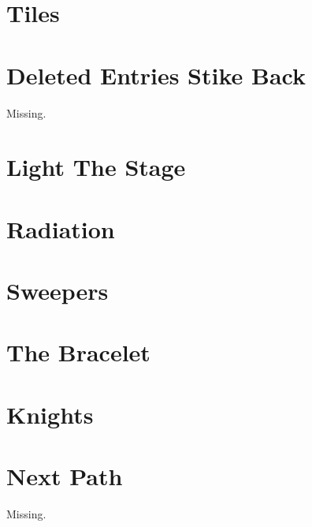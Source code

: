 \documentclass[a4paper, 10pt]{article}
\let\stdsection\section
\renewcommand\section{\newpage\stdsection}
\newcommand{\includecode}[1]{
    }
\newcommand{\algoAuthor}{2} %
\begin{document}
    \section{Tiles}
        \label{sec:tiles}
        \includecode{../problems/w11/Tiles/Tiles\algoAuthor.cpp}
        
    
    \section{Deleted Entries Stike Back}
        \label{sec:deleted_entries_strike_back}
        Missing.
        
    \section{Light The Stage}
        \label{sec:light_the_stage}
        \includecode{../problems/w12/Light_The_Stage/LightTheStage\algoAuthor.cpp}
        
    \section{Radiation}
        \label{sec:radiation}
        \includecode{../problems/w12/Radiation/Radiation\algoAuthor.cpp}
        
    \section{Sweepers}
        \label{sec:sweepers}
        \includecode{../problems/w12/Sweepers/Sweepers\algoAuthor.cpp}
        
    \section{The Bracelet}
        \label{sec:the_bracelet}
        \includecode{../problems/w12/The_Bracelet/TheBracelet\algoAuthor.cpp}
        
    
    \section{Knights}
        \label{sec:knights}
        \includecode{../problems/w13/Knights/Knights\algoAuthor.cpp}
        
    \section{Next Path}
        \label{sec:next_path}
        Missing.
        
\end{document}
